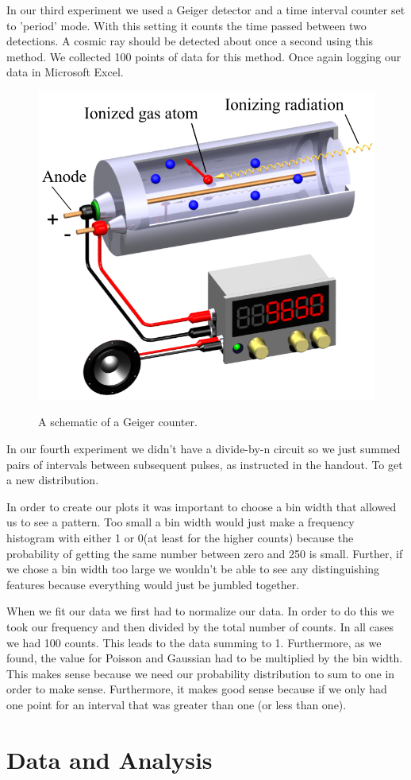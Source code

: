 \documentclass[12pt letterpaper]{article}
\begin{document}
In our third experiment we used a Geiger detector and a time interval counter set to 'period' mode. With this setting it counts the time passed between two detections. A cosmic ray should be detected about once a second using this method. We collected 100 points of data for this method. Once again logging our data in Microsoft Excel. 

\begin{figure}[H]
  \caption{A schematic of a Geiger counter.}
  \centering
    \includegraphics[width=.5\textwidth]{geiger.png}
    \label{fig:geiger}
\end{figure}


In our fourth experiment we didn't have a divide-by-n circuit so we just summed pairs of intervals between subsequent pulses, as instructed in the handout. To get a new distribution. 

In order to create our plots it was important to choose a bin width that allowed us to see a pattern. Too small a bin width would just make a frequency histogram with either 1 or 0(at least for the higher counts) because the probability of getting the same number between zero and 250 is small. Further, if we chose a bin width too large we wouldn't be able to see any distinguishing features because everything would just be jumbled together. 


When we fit our data we first had to normalize our data. In order to do this we took our frequency and then divided by the total number of counts. In all cases we had 100 counts. This leads to the data summing to 1. Furthermore, as we found, the value for Poisson and Gaussian had to be multiplied by the bin width. This makes sense because we need our probability distribution to sum to one in order to make sense. Furthermore, it makes good sense because if we only had one point for an interval that was greater than one (or less than one). 


\section*{Data and Analysis}
\end{document}
